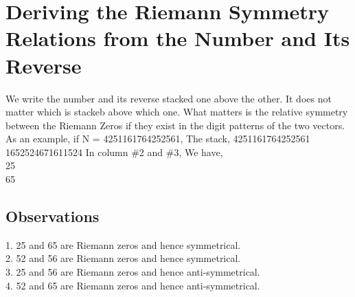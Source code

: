 \section{Deriving the Riemann Symmetry Relations from the Number and Its Reverse}
We write the number and its reverse stacked one above the other. It does not matter which is stackeb above which one. What matters is the relative symmetry between the Riemann Zeros if they exist in the digit patterns of the two vectors.
As an example, if N = 4251161764252561,
The stack,
4251161764252561
1652524671611524
In column \#2 and \#3, 
We have,\\
25\\
65

\subsection{Observations}
1. 25 and 65 are Riemann zeros and hence symmetrical. \\
2. 52 and 56 are Riemann zeros and hence symmetrical. \\
3. 25 and 56 are Riemann zeros and hence anti-symmetrical. \\
4. 52 and 65 are Riemann zeros and hence anti-symmetrical. \\



